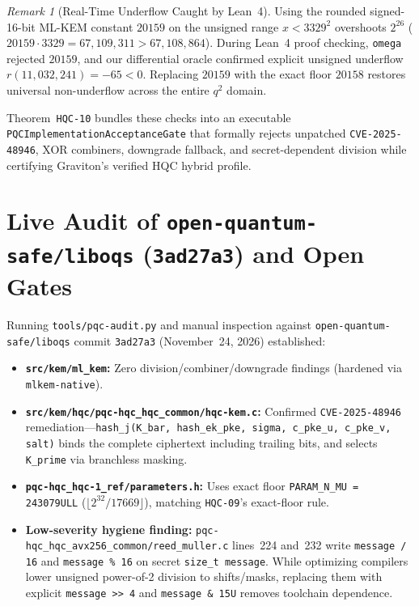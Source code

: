 \documentclass[11pt,a4paper]{article}
\theoremstyle{plain}
\theoremstyle{remark}
\newtheorem{remark}[theorem]{Remark}
\newcommand{\code}[1]{\texttt{\small #1}}
\begin{document}
\begin{remark}[Real-Time Underflow Caught by Lean~4]
Using the rounded signed-16-bit ML-KEM constant $20159$ on the unsigned range $x < 3329^2$ overshoots $2^{26}$ ($20159\cdot 3329 = 67{,}109{,}311 > 67{,}108{,}864$). During Lean~4 proof checking, \code{omega} rejected $20159$, and our differential oracle confirmed explicit unsigned underflow $r(11{,}032{,}241) = -65 < 0$. Replacing $20159$ with the exact floor $20158$ restores universal non-underflow across the entire $q^2$ domain.
\end{remark}

Theorem~\code{HQC-10} bundles these checks into an executable \code{PQCImplementationAcceptanceGate} that formally rejects unpatched \code{CVE-2025-48946}, XOR combiners, downgrade fallback, and secret-dependent division while certifying Graviton's verified HQC hybrid profile.

\section{Live Audit of \code{open-quantum-safe/liboqs} (\code{3ad27a3}) and Open Gates}
\label{sec:liboqs-audit}

Running \code{tools/pqc-audit.py} and manual inspection against \code{open-quantum-safe/liboqs} commit \code{3ad27a3} (November~24, 2026) established:
\begin{itemize}
  \item \textbf{\code{src/kem/ml\_kem}:} Zero division/combiner/downgrade findings (hardened via \code{mlkem-native}).
  \item \textbf{\code{src/kem/hqc/pqc-hqc\_hqc\_common/hqc-kem.c}:} Confirmed \code{CVE-2025-48946} remediation—\code{hash\_j(K\_bar, hash\_ek\_pke, sigma, c\_pke\_u, c\_pke\_v, salt)} binds the complete ciphertext including trailing bits, and selects \code{K\_prime} via branchless masking.
  \item \textbf{\code{pqc-hqc\_hqc-1\_ref/parameters.h}:} Uses exact floor \code{PARAM\_N\_MU = 243079ULL} ($\lfloor 2^{32}/17669\rfloor$), matching \code{HQC-09}'s exact-floor rule.
  \item \textbf{Low-severity hygiene finding:} \code{pqc-hqc\_hqc\_avx256\_common/reed\_muller.c} lines~224 and~232 write \code{message / 16} and \code{message \% 16} on secret \code{size\_t message}. While optimizing compilers lower unsigned power-of-2 division to shifts/masks, replacing them with explicit \code{message >> 4} and \code{message \& 15U} removes toolchain dependence.
\end{itemize}
\end{document}
